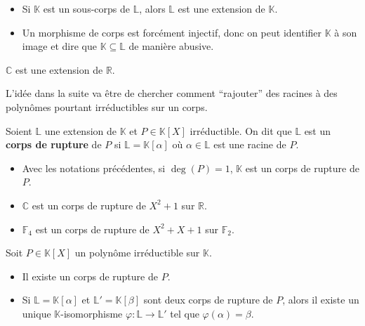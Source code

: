 	\begin{remark}
		\begin{itemize}
			\item Si $\mathbb{K}$ est un sous-corps de $\mathbb{L}$, alors $\mathbb{L}$ est une extension de $\mathbb{K}$.
			\item Un morphisme de corps est forcément injectif, donc on peut identifier $\mathbb{K}$ à son image et dire que $\mathbb{K} \subseteq \mathbb{L}$ de manière abusive.
		\end{itemize}
	\end{remark}

	\begin{example}
		$\mathbb{C}$ est une extension de $\mathbb{R}$.
	\end{example}

	L'idée dans la suite va être de chercher comment ``rajouter'' des racines à des polynômes pourtant irréductibles sur un corps.


	\begin{definition}
    Soient $\mathbb{L}$ une extension de $\mathbb{K}$ et $P \in \mathbb{K}[X]$ irréductible. On dit que $\mathbb{L}$ est un \textbf{corps de rupture} de $P$ si $\mathbb{L} = \mathbb{K}[\alpha]$ où $\alpha \in \mathbb{L}$ est une racine de $P$.
	\end{definition}

	\begin{example}
		\begin{itemize}
			\item Avec les notations précédentes, si $\deg(P) = 1$, $\mathbb{K}$ est un corps de rupture de $P$.
			\item $\mathbb{C}$ est un corps de rupture de $X^2+1$ sur $\mathbb{R}$.
			\item $\mathbb{F}_4$ est un corps de rupture de $X^2+X+1$ sur $\mathbb{F}_2$.
		\end{itemize}
	\end{example}

	\begin{theorem}
		Soit $P \in \mathbb{K}[X]$ un polynôme irréductible sur $\mathbb{K}$.
		\begin{itemize}
			\item Il existe un corps de rupture de $P$.
			\item Si $\mathbb{L} = \mathbb{K}[\alpha]$ et $\mathbb{L}' = \mathbb{K}[\beta]$ sont deux corps de rupture de $P$, alors il existe un unique $\mathbb{K}$-isomorphisme $\varphi : \mathbb{L} \rightarrow \mathbb{L}'$ tel que $\varphi(\alpha) = \beta$.
		\end{itemize}
	\end{theorem}

